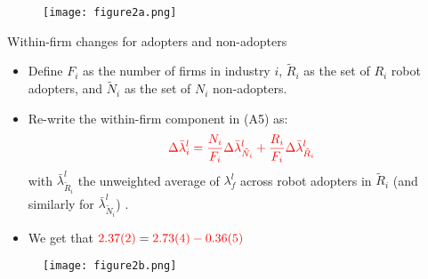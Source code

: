 \documentclass[notes=show]{beamer}
\begin{document}
\newpage
\begin{center}
\vspace*{0.2cm}
\begin{figure}
\texttt{[image: figure2a.png]}
\end{figure} 
\end{center}
\newpage

\begin{frame}{Within-firm changes for adopters and non-adopters}
\begin{itemize}
\item Define $F_{i}$ as the number of firms in industry $i$, $\tilde{R}_{i}$ as the set of $R_{i}$ robot adopters, and $ \tilde{N}_{i} $ as the set of $N_{i}$ non-adopters. \medskip
\item Re-write the within-firm component in (A5) as:
\[
\color{red} \Delta \bar{\lambda}_{i}^{l} = \frac{N_{i}}{F_{i}} \Delta \bar{\lambda}_{\tilde{N}_{i}}^{l} + \frac{R_{i}}{F_{i}} \Delta \bar{\lambda}_{\tilde{R}_{i}}^{l}
\]
with $ \bar{\lambda}_{\tilde{R}_{i}}^{l} $ the unweighted average of $ \lambda_{f}^{l} $ across robot adopters in $\tilde{R}_{i}$ (and similarly for $ \bar{\lambda}_{\tilde{N}_{i}}^{l} $) \medskip.
\item We get that $ \color{red} 2.37 \text{(2)} \color{black} = \color{red} 2.73 \text{(4)} \color{red} -0.36 \text{(5)} $
\end{itemize}
\end{frame}

\newpage
\begin{center}
\vspace*{0.2cm}
\begin{figure}
\texttt{[image: figure2b.png]}
\end{figure} 
\end{center}
\newpage
\end{document}
